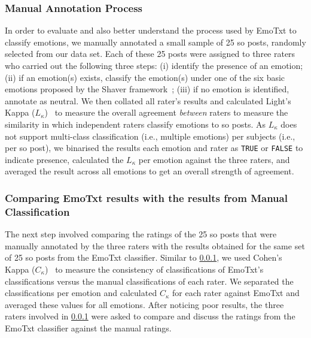 \def\light{$L_{\kappa}$}
\subsubsection{Manual Annotation Process} \label{semotion2020:ssec:manual}
In order to evaluate and also better understand the process used by EmoTxt to classify emotions, we manually annotated a small sample of 25 \gls{so} posts, randomly selected from our data set. Each of these 25 posts were assigned to three raters who carried out the following three steps: (i) identify the presence of an emotion; (ii) if an emotion(s) exists, classify the emotion(s) under one of the six basic emotions proposed by the Shaver framework~\citep{shaver1987}; (iii) if no emotion is identified, annotate as neutral.
We then collated all rater's results and calculated Light's Kappa (\light{})~\citep{Light:1971vz} to measure the overall agreement \textit{between} raters to measure the similarity in which independent raters classify emotions to \gls{so} posts. As \light{} does not support multi-class classification (i.e., multiple emotions) per subjects (i.e., per \gls{so} post), we binarised the results each emotion and rater as \texttt{TRUE} or \texttt{FALSE} to indicate presence, calculated the \light{} per emotion against the three raters, and averaged the result across all emotions to get an overall strength of agreement.

\subsubsection{Comparing EmoTxt results with the results from Manual Classification}

\def\cohen{$C_{\kappa}$}
The next step involved comparing the ratings of the 25 \gls{so} posts that were manually annotated by the three raters with the results obtained for the same set of 25 \gls{so} posts from the EmoTxt classifier. 
Similar to \cref{semotion2020:ssec:manual}, we used Cohen's Kappa (\cohen{})~\citep{Cohen:1960tf} to measure the consistency of classifications of EmoTxt's classifications versus the manual classifications of each rater. We separated the classifications per emotion and calculated \cohen{} for each rater against EmoTxt and averaged these values for all emotions.
After noticing poor results, the three raters involved in \cref{semotion2020:ssec:manual} were asked to compare and discuss the ratings from the EmoTxt classifier against the manual ratings. 

